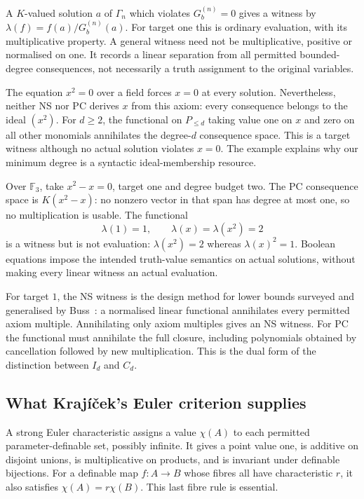 A $K$-valued solution $a$ of $\Gamma_n$ which violates $G_b^{(n)}=0$ gives a
witness by $\lambda(f)=f(a)/G_b^{(n)}(a)$. For target one this is ordinary
evaluation, with its multiplicative property. A general witness need
not be multiplicative, positive or normalised on one. It records a
linear separation from all permitted bounded-degree consequences,
not necessarily a truth assignment to the original variables.

\begin{example}
The equation $x^2=0$ over a field forces $x=0$ at every solution.
Nevertheless, neither NS nor PC derives $x$ from this axiom: every
consequence belongs to the ideal $(x^2)$. For $d\ge2$, the functional
on $P_{\le d}$ taking value one on $x$ and zero on all other monomials
annihilates the degree-$d$ consequence space. This is a target witness
although no actual solution violates $x=0$. The example explains why
our minimum degree is a syntactic ideal-membership resource.
\end{example}

\begin{example}
Over $\mathbb F_3$, take $x^2-x=0$, target one and degree budget two.
The PC consequence space is $K(x^2-x)$: no nonzero vector in that span
has degree at most one, so no multiplication is usable. The functional
\[
 \lambda(1)=1,\qquad\lambda(x)=\lambda(x^2)=2
\]
is a witness but is not evaluation: $\lambda(x^2)=2$ whereas
$\lambda(x)^2=1$. Boolean equations impose the intended truth-value
semantics on actual solutions, without making every linear witness an
actual evaluation.
\end{example}

For target $1$, the NS witness is the design method for lower bounds
surveyed and generalised by Buss~\cite{BussDesign}: a normalised
linear functional annihilates every permitted axiom multiple.
Annihilating only axiom multiples gives an NS witness. For PC the
functional must annihilate the full closure, including polynomials
obtained by cancellation followed by new multiplication. This is the
dual form of the distinction between $I_d$ and $C_d$.

\subsection{What Kraj\'i\v cek's Euler criterion supplies}
A strong Euler characteristic assigns a value $\chi(A)$ to each
permitted parameter-definable set, possibly infinite. It gives a point
value one, is additive on disjoint unions, is multiplicative on products,
and is invariant under definable bijections. For a definable map
$f:A\to B$ whose fibres all have characteristic $r$, it also satisfies
$\chi(A)=r\chi(B)$. This last fibre rule is essential.

